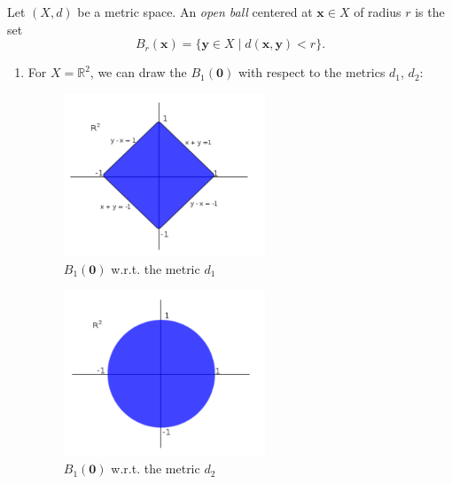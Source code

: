 \begin{definition}
Let $(X,d)$ be a metric space. An \emph{open ball} centered at $\bm x\in X$ of radius $r$ is the set
\[
B_r(\bm x)=\{\bm y\in X\mid d(\bm x,\bm y)<r\}.
\]
\end{definition}
\begin{example}
\begin{enumerate}
\item
For $X=\mathbb{R}^2$, we can draw the $B_1(\bm0)$ with respect to the metrics $d_1$, $d_2$:
\begin{figure}[H]
\centering\includegraphics[width=6cm]{week1/f_1_1}
\caption{$B_1(\bm0)$ w.r.t. the metric $d_1$}
\end{figure}
\begin{figure}[H]
\centering\includegraphics[width=6cm]{week1/f_1_2}
\caption{$B_1(\bm0)$ w.r.t. the metric $d_2$}
\end{figure}
\end{enumerate}
\end{example}













